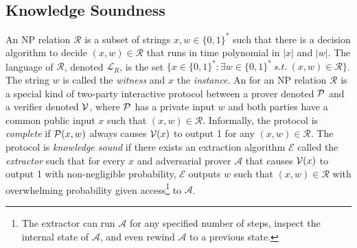 \documentclass{article}
\theoremstyle{definition}
\begin{document}
\subsection{Knowledge Soundness}
An NP relation $\mathcal{R}$ is a subset of strings $x, w \in \{0,1\}^*$ such that there is a decision algorithm to decide $(x, w) \in \mathcal{R}$ that runs in time polynomial in $|x|$ and $|w|$. The language of $\mathcal{R}$, denoted $\mathcal{L}_R$, is the set $\{x \in \{0,1\}^*: \exists w \in \{0,1\}^* \ s.t. \ (x, w) \in \mathcal{R} \}$. The string $w$ is called the \emph{witness} and $x$ the \emph{instance}.
An  for an NP relation $\mathcal{R}$ is a special kind of two-party interactive protocol between a prover denoted $\mathcal{P}$ and a verifier denoted $\mathcal{V}$, where $\mathcal{P}$ has a private input $w$ and both parties have a common public input $x$ such that $(x,w) \in \mathcal{R}$. Informally, the protocol is \emph{complete} if $\mathcal{P}(x, w)$ always causes $\mathcal{V}(x)$ to output 1 for any $(x, w) \in \mathcal{R}$. The protocol is \emph{knowledge sound} if there exists an extraction algorithm $\mathcal{E}$ called the \emph{extractor} such that for every $x$ and adversarial prover $\mathcal{A}$ that causes $\mathcal{V}(x)$ to output 1 with non-negligible probability, $\mathcal{E}$ outputs $w$ such that $(x, w) \in \mathcal{R}$ with overwhelming probability given access\footnote{The extractor can run $\mathcal{A}$ for any specified number of steps, inspect the internal state of $\mathcal{A}$, and even rewind $\mathcal{A}$ to a previous state.} to $\mathcal{A}$. 
\end{document}
